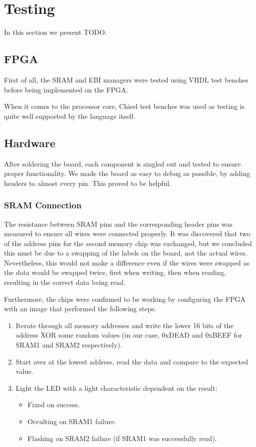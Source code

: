 \section{Testing}

In this section we present TODO.

\subsection{FPGA}
First of all, the SRAM and EBI managers were tested using VHDL test benches before being implemented on the FPGA.

When it comes to the processor core, Chisel test benches was used as testing is quite well supported by the language itself.

\subsection{Hardware}
After soldering the board, each component is singled out and tested to ensure proper functionality.
We made the board as easy to debug as possible, by adding headers to almost every pin.
This proved to be helpful.

\subsubsection{SRAM Connection}
The resistance between SRAM pins and the corresponding header pins was measured to ensure all wires were connected properly.
It was discovered that two of the address pins for the second memory chip was exchanged, but we concluded this must be due to a swapping of the labels on the board, not the actual wires.
Nevertheless, this would not make a difference even if the wires were swapped as the data would be swapped twice, first when writing, then when reading, resulting in the correct data being read.

Furthermore, the chips were confirmed to be working by configuring the FPGA with an image that performed the following steps:
\begin{enumerate}
    \item Iterate through all memory addresses and write the lower 16 bits of the address XOR some random values (in our case, 0xDEAD and 0xBEEF for SRAM1 and SRAM2 respectively).
    \item Start over at the lowest address, read the data and compare to the expected value.
    \item Light the LED with a light characteristic dependent on the result:
        \begin{itemize}
            \item Fixed on success.
            \item Occulting on SRAM1 failure.
            \item Flashing on SRAM2 failure (if SRAM1 was successfully read).
        \end{itemize}
\end{enumerate}

